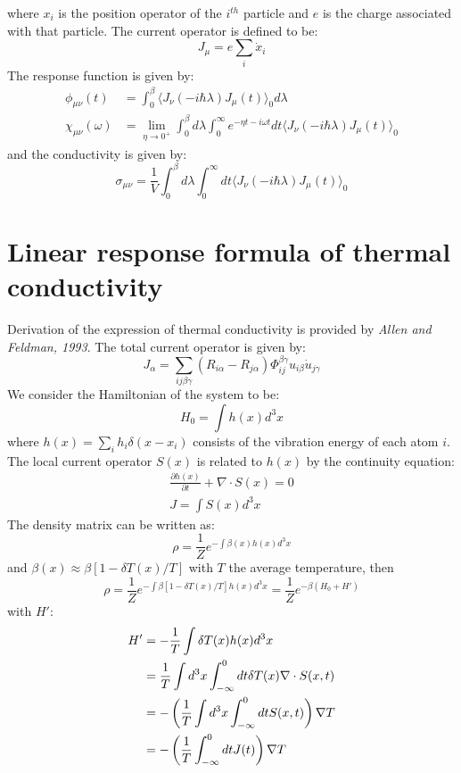 \documentclass{article}
\begin{document}
where $x_i$ is the position operator of the $i^{th}$ particle and $e$ is the charge associated with that
particle. The current operator is 
defined to be:
\begin{equation}
    J_{\mu} = e \sum_i \dot{x}_i
\end{equation}
The response function is given by:
\begin{align}
    \phi_{\mu\nu} (t) &= \int_0^{\beta} \langle J_{\nu}(-i\hbar\lambda) J_{\mu}(t) \rangle_0 d\lambda \\
    \chi_{\mu\nu}(\omega)&= 
    \lim_{\eta\to 0^+} \int_0^{\beta} d\lambda \int_{0}^{\infty} e^{-\eta t-i\omega t} dt  \langle J_{\nu}(-i\hbar\lambda) J_{\mu}(t) \rangle_0
\end{align}
and the conductivity is given by:
\begin{equation}
    \sigma_{\mu\nu} = \frac{1}{V} \int_0^{\beta} d\lambda \int_{0}^{\infty} dt \langle J_{\nu}(-i\hbar\lambda) J_{\mu}(t) \rangle_0
\end{equation}

\section{Linear response formula of thermal conductivity}
Derivation of the expression of thermal conductivity is provided by \emph{Allen and Feldman, 1993}. 
The total current operator is given by:
\begin{equation}
    J_{\alpha} = \sum_{ij\beta\gamma} (R_{i\alpha} - R_{j\alpha}) \Phi_{ij}^{\beta\gamma} u_{i\beta} \dot{u}_{j\gamma}
\end{equation}
We consider the Hamiltonian of the system to be:
\begin{equation}
    H_0 = \int h(x)  d^3x
\end{equation}
where $h(x) = \sum_i h_i \delta(x - x_i)$ consists of the vibration energy of each atom $i$. 
The local current operator $S(x)$ is related to $h(x)$ by the continuity equation:
\begin{gather}
    \frac{\partial h(x)}{\partial t} + \nabla\cdot S(x) = 0 \\
    J = \int S(x) d^3x
\end{gather}
The density matrix can be written as:
\begin{equation}
    \rho = \frac{1}{Z} e^{- \int \beta(x) h(x) d^3x}
\end{equation}
and $\beta(x) \approx \beta[1-\delta T(x)/T]$ with $T$ the average temperature, then
\begin{equation}
    \rho = \frac{1}{Z} e^{- \int \beta[1-\delta T(x)/T] h(x) d^3x} = \frac{1}{Z} e^{- \beta (H_0 + H')}
\end{equation}
with $H'$:
\begin{align}
    H' &= -\frac{1}{T} \int \delta T(x)h(x) d^3x \notag \\
        & = \frac{1}{T} \int d^3x \int _{-\infty}^{0} dt \delta T(x) \nabla\cdot S(x,t) \notag \\
        & = - \left( \frac{1}{T} \int d^3x \int _{-\infty}^{0} dt S(x,t) \right) \nabla T \notag \\
        & = - \left( \frac{1}{T} \int _{-\infty}^{0} dt J(t) \right) \nabla T 
\end{align}
\end{document}
